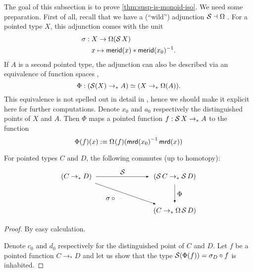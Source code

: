 \documentclass[english,a4]{article}
\newcommand{\ptdto}{\to_\ast}%
\begin{document}
The goal of this subsection is to prove \cref{thm:susp-is-monoid-iso}.
We need some preparation.
First of all, recall that we have a (``wild'') adjunction $\operatorname{\mathcal S} \dashv \Omega$ \cite[find lemma]{HoTT}.
For a pointed type $X$, this adjunction comes with the unit
\begin{align}
\sigma : \; &X \to \Omega(\operatorname{\mathcal S} X) \label{eq:sigma} \\
&x \mapsto \mathsf{merid}(x) * \mathsf{merid}(x_0)^{-1}.
\end{align}
If $A$ is a second pointed type, the adjunction can also be described via an equivalence of function spaces \cite[Lemma 6.5.4]{HoTT},
\begin{equation}\label{eq:adj-equivalence-susp-loopspace}
\Phi : (\operatorname{\mathcal S}(X) \to_* A) \simeq (X \to_* \Omega(A)).
\end{equation}
This equivalence is not spelled out in detail in \cite[Lemma 6.5.4]{HoTT}, hence we
should make it explicit here for further computations. Denote $x_0$ and $a_0$ respectively the distinguished points of $X$ and $A$. Then $\Phi$ maps a pointed function $f:\susp X \ptdto A$ to the function
\begin{displaymath}
  \Phi(f) (x) \defequi \loopspace \null (f)(\inv{\mrd (x_0)} \mrd(x))
\end{displaymath}

\begin{lemma} \label{lem:adj-prop}
    For pointed types $C$ and $D$, the following commutes (up to homotopy):
    \begin{equation}
    \begin{tikzpicture}[x=5cm,y=-1.75cm,baseline=(current bounding box.center)]
    \tikzset{arrow/.style={shorten >=0.1cm,shorten <=.1cm,-latex}}
    \node (A) at (0,0) {$(C \to_* D)$}; 
    \node (D) at (1,0) {$(\susp C \to_* \susp D)$}; 
    \node (C) at (1,1) {$(C \to_* \Omega \susp D)$}; 
    
    \draw[arrow] (A) to node [above] {$\susp$} (D);
    \draw[arrow] (A) to node [below left] {$\sigma \circ \, \blank$} (C);
    \draw[arrow] (D) to node [right] {$\Phi$} (C);
    \end{tikzpicture}
    \end{equation}
\end{lemma}
\begin{proof}
    By easy calculation.

  Denote $c_0$ and $d_0$ respectively for the distinguished point of $C$ and $D$.
  Let $f$ be a pointed function $C \ptdto D$ and let us show that the type
  $\operatorname{\mathcal S} (\Phi (f)) = \sigma_D \circ f$ is inhabited.
\end{proof}
\end{document}
